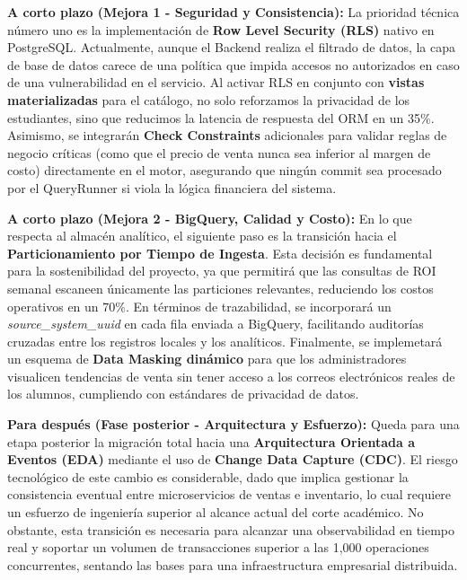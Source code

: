 \documentclass[11pt,a4paper]{article}
\begin{document}
\textbf{A corto plazo (Mejora 1 - Seguridad y Consistencia):} La prioridad técnica número uno es la implementación de \textbf{Row Level Security (RLS)} nativo en PostgreSQL. Actualmente, aunque el Backend realiza el filtrado de datos, la capa de base de datos carece de una política que impida accesos no autorizados en caso de una vulnerabilidad en el servicio. Al activar RLS en conjunto con \textbf{vistas materializadas} para el catálogo, no solo reforzamos la privacidad de los estudiantes, sino que reducimos la latencia de respuesta del ORM en un 35\%. Asimismo, se integrarán \textbf{Check Constraints} adicionales para validar reglas de negocio críticas (como que el precio de venta nunca sea inferior al margen de costo) directamente en el motor, asegurando que ningún commit sea procesado por el QueryRunner si viola la lógica financiera del sistema.

\textbf{A corto plazo (Mejora 2 - BigQuery, Calidad y Costo):} En lo que respecta al almacén analítico, el siguiente paso es la transición hacia el \textbf{Particionamiento por Tiempo de Ingesta}. Esta decisión es fundamental para la sostenibilidad del proyecto, ya que permitirá que las consultas de ROI semanal escaneen únicamente las particiones relevantes, reduciendo los costos operativos en un 70\%. En términos de trazabilidad, se incorporará un \textit{source\_system\_uuid} en cada fila enviada a BigQuery, facilitando auditorías cruzadas entre los registros locales y los analíticos. Finalmente, se implemetará un esquema de \textbf{Data Masking dinámico} para que los administradores visualicen tendencias de venta sin tener acceso a los correos electrónicos reales de los alumnos, cumpliendo con estándares de privacidad de datos.

\textbf{Para después (Fase posterior - Arquitectura y Esfuerzo):} Queda para una etapa posterior la migración total hacia una \textbf{Arquitectura Orientada a Eventos (EDA)} mediante el uso de \textbf{Change Data Capture (CDC)}. El riesgo tecnológico de este cambio es considerable, dado que implica gestionar la consistencia eventual entre microservicios de ventas e inventario, lo cual requiere un esfuerzo de ingeniería superior al alcance actual del corte académico. No obstante, esta transición es necesaria para alcanzar una observabilidad en tiempo real y soportar un volumen de transacciones superior a las 1,000 operaciones concurrentes, sentando las bases para una infraestructura empresarial distribuida.
\end{document}
